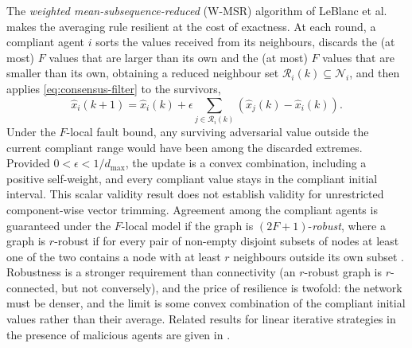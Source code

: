 The \emph{weighted mean-subsequence-reduced} (W-MSR) algorithm of LeBlanc et al.\ \cite{leblanc2013_wmsr} makes the averaging rule resilient at the cost of exactness. At each round, a compliant agent $i$ sorts the values received from its neighbours, discards the (at most) $F$ values that are larger than its own and the (at most) $F$ values that are smaller than its own, obtaining a reduced neighbour set $\mathcal{R}_i(k)\subseteq\mathcal{N}_i$, and then applies \eqref{eq:consensus-filter} to the survivors,
\begin{equation}
\widehat{x}_i(k+1)=\widehat{x}_i(k)+\epsilon\sum_{j\in\mathcal{R}_i(k)}\left(\widehat{x}_j(k)-\widehat{x}_i(k)\right).
\label{eq:wmsr}
\end{equation}
Under the $F$-local fault bound, any surviving adversarial value outside the current compliant range would have been among the discarded extremes. Provided $0<\epsilon<1/d_{\max}$, the update is a convex combination, including a positive self-weight, and every compliant value stays in the compliant initial interval. This scalar validity result does not establish validity for unrestricted component-wise vector trimming. Agreement among the compliant agents is guaranteed under the $F$-local model if the graph is $(2F+1)$-\emph{robust}, where a graph is $r$-robust if for every pair of non-empty disjoint subsets of nodes at least one of the two contains a node with at least $r$ neighbours outside its own subset \cite{leblanc2013_wmsr}. Robustness is a stronger requirement than connectivity (an $r$-robust graph is $r$-connected, but not conversely), and the price of resilience is twofold: the network must be denser, and the limit is some convex combination of the compliant initial values rather than their average. Related results for linear iterative strategies in the presence of malicious agents are given in \cite{sundaram2011_malicious}.

